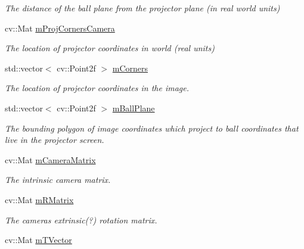 \begin{DoxyCompactItemize}
\begin{DoxyCompactList}\small\item\em The distance of the ball plane from the projector plane (in real world units) \end{DoxyCompactList}\item 
cv\+::\+Mat \hyperlink{classTrackingStream_a7c4a1620f5b3ad8ee91cc40aa586c7bb}{m\+Proj\+Corners\+Camera}
\begin{DoxyCompactList}\small\item\em The location of projector coordinates in world (real units) \end{DoxyCompactList}\item 
std\+::vector$<$ cv\+::\+Point2f $>$ \hyperlink{classTrackingStream_a74a9669165a38a0e3027d4fd9f8c60ca}{m\+Corners}
\begin{DoxyCompactList}\small\item\em The location of projector coordinates in the image. \end{DoxyCompactList}\item 
std\+::vector$<$ cv\+::\+Point2f $>$ \hyperlink{classTrackingStream_ab7c019129608f23628c5d24b5dc9c384}{m\+Ball\+Plane}\hypertarget{classTrackingStream_ab7c019129608f23628c5d24b5dc9c384}{}\label{classTrackingStream_ab7c019129608f23628c5d24b5dc9c384}

\begin{DoxyCompactList}\small\item\em The bounding polygon of image coordinates which project to ball coordinates that live in the projector screen. \end{DoxyCompactList}\item 
cv\+::\+Mat \hyperlink{classTrackingStream_a8b4a91278c9dc671d43e8284c2fa92a6}{m\+Camera\+Matrix}\hypertarget{classTrackingStream_a8b4a91278c9dc671d43e8284c2fa92a6}{}\label{classTrackingStream_a8b4a91278c9dc671d43e8284c2fa92a6}

\begin{DoxyCompactList}\small\item\em The intrinsic camera matrix. \end{DoxyCompactList}\item 
cv\+::\+Mat \hyperlink{classTrackingStream_ada535422209fba660899dc3f7d41ddef}{m\+R\+Matrix}\hypertarget{classTrackingStream_ada535422209fba660899dc3f7d41ddef}{}\label{classTrackingStream_ada535422209fba660899dc3f7d41ddef}

\begin{DoxyCompactList}\small\item\em The camera\textquotesingle{}s extrinsic(?) rotation matrix. \end{DoxyCompactList}\item 
cv\+::\+Mat \hyperlink{classTrackingStream_a8ab5b4cedd560ec7a6e10ed58c9a07a4}{m\+T\+Vector}\hypertarget{classTrackingStream_a8ab5b4cedd560ec7a6e10ed58c9a07a4}{}\label{classTrackingStream_a8ab5b4cedd560ec7a6e10ed58c9a07a4}


\end{DoxyCompactItemize}
